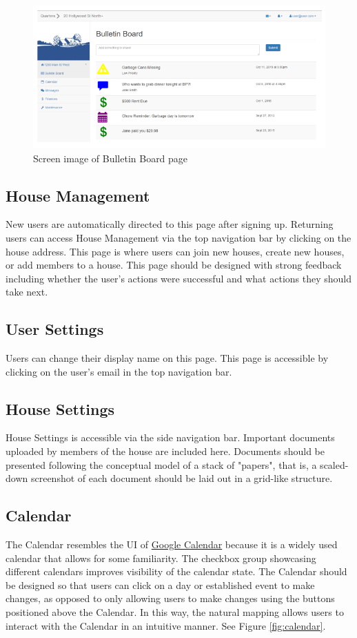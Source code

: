 \documentclass[12pt]{article}
\begin{document}
\begin{figure}[h]
\centering
\includegraphics[width=\textwidth]{bulletin}
\caption{Screen image of Bulletin Board page}
\label{fig:bulletin}
\end{figure}

\subsection{House Management}\label{management}
New users are automatically directed to this page after signing up. Returning users can access House Management via the top navigation bar by clicking on the house address. This page is where users can join new houses, create new houses, or add members to a house. This page should be designed with strong feedback including whether the user's actions were successful and what actions they should take next.

\subsection{User Settings}
Users can change their display name on this page. This page is accessible by clicking on the user's email in the top navigation bar.

\subsection{House Settings}
House Settings is accessible via the side navigation bar. Important documents uploaded by members of the house are included here. Documents should be presented following the conceptual model of a stack of "papers", that is, a scaled-down screenshot of each document should be laid out in a grid-like structure.

\subsection{Calendar}
The Calendar resembles the UI of \href{https://apps.google.com/products/calendar/‎}{Google Calendar} because it is a widely used calendar that allows for some familiarity. The checkbox group showcasing different calendars improves visibility of the calendar state. The Calendar should be designed so that users can click on a day or established event to make changes, as opposed to only allowing users to make changes using the buttons positioned above the Calendar. In this way, the natural mapping allows users to interact with the Calendar in an intuitive manner. See Figure \ref{fig:calendar}.
\end{document}
